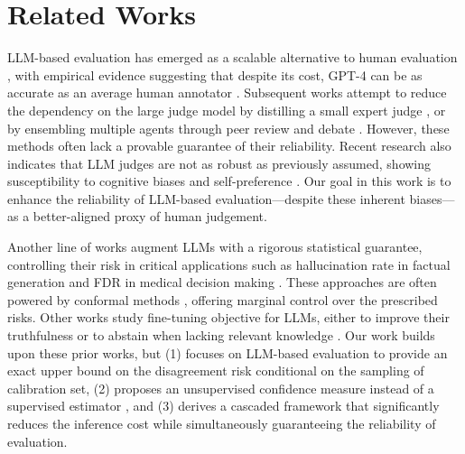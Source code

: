\section{Related Works}
LLM-based evaluation has emerged as a scalable alternative to human evaluation \citep{mt-bench, gpteval}, with empirical evidence suggesting that despite its cost, GPT-4 can be as accurate as an average human annotator \citep{lc-alpacaeval, arena-hard}. Subsequent works attempt to reduce the dependency on the large judge model by distilling a small expert judge \citep{prometheus-2, judgelm}, or by ensembling multiple agents through peer review and debate \citep{replacing-judges-with-juries, chateval}. However, these methods often lack a provable guarantee of their reliability. Recent research also indicates that LLM judges are not as robust as previously assumed, showing susceptibility to cognitive biases \citep{llmbar, cobbler} and self-preference \citep{self-preference}. Our goal in this work is to enhance the reliability of LLM-based evaluation---despite these inherent biases---as a better-aligned proxy of human judgement.

Another line of works augment LLMs with a rigorous statistical guarantee, controlling their risk in critical applications such as hallucination rate in factual generation \citep{conformal-abstention, conformal-factuality-guarantee} and FDR in medical decision making \citep{conformal-alignment}. These approaches are often powered by conformal methods \citep{conformal-risk-control}, offering marginal control over the prescribed risks. Other works study fine-tuning objective for LLMs, either to improve their truthfulness \citep{unfamiliar-fine-tuning-examples, fine-tuning-LMs-for-factuality} or to abstain when lacking relevant knowledge \citep{r-tuning}. Our work builds upon these prior works, but (1) focuses on LLM-based evaluation to provide an exact upper bound on the disagreement risk conditional on the sampling of calibration set, (2) proposes an unsupervised confidence measure instead of a supervised estimator \citep{calibration-tuning, token-level-uncertainty}, and (3) derives a cascaded framework that significantly reduces the inference cost while simultaneously guaranteeing the reliability of evaluation.